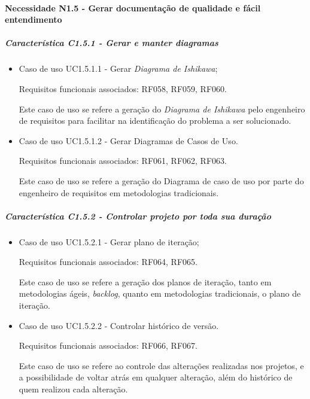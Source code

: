 \paragraph{Necessidade N1.5 - Gerar documentação de qualidade e fácil entendimento}
	\subparagraph{Característica C1.5.1 - Gerar e manter diagramas}
		\begin{itemize}
					
			\item Caso de uso UC1.5.1.1 - Gerar \textit{Diagrama de Ishikawa};
				
				Requisitos funcionais associados: RF058, RF059, RF060.

				Este caso de uso se refere a geração do \textit{Diagrama de Ishikawa} pelo engenheiro de requisitos para facilitar na identificação do problema a ser solucionado.
			
			\item Caso de uso UC1.5.1.2 - Gerar Diagramas de Casos de Uso.
				
				Requisitos funcionais associados: RF061, RF062, RF063.

				Este caso de uso se refere a geração do Diagrama de caso de uso por parte do engenheiro de requisitos em metodologias tradicionais.
		\end{itemize}

	\subparagraph{Característica C1.5.2 - Controlar projeto por toda sua duração}
		\begin{itemize}
			
			\item Caso de uso UC1.5.2.1 - Gerar plano de iteração;
					
					Requisitos funcionais associados: RF064, RF065.
					
					Este caso de uso se refere a geração dos planos de iteração, tanto em metodologias ágeis, \textit{backlog}, quanto em metodologias tradicionais, o plano de iteração.

			\item Caso de uso UC1.5.2.2 - Controlar histórico de versão.
				
				Requisitos funcionais associados: RF066, RF067.

				Este caso de uso se refere ao controle das alterações realizadas nos projetos, e a possibilidade de voltar atrás em qualquer alteração, além do histórico de quem realizou cada alteração.

		\end{itemize}

